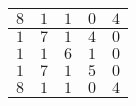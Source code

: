 \documentclass[12pt]{article}
\begin{document}
\begin{tabular}{|c|c|c|c|c|}
\hline
$8$ & $1$ & $1$ & $0$ & $4$ \\ \hline
$1$ & $7$ & $1$ & $4$ & $0$ \\ \hline
$1$ & $1$ & $6$ & $1$ & $0$ \\ \hline
$1$ & $7$ & $1$ & $5$ & $0$ \\ \hline
$8$ & $1$ & $1$ & $0$ & $4$ \\ \hline

\end{tabular}





\break











\end{document}
